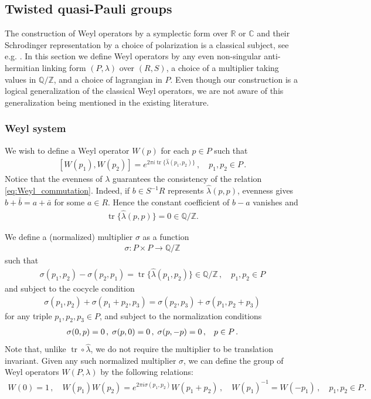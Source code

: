 \documentclass[sn-mathphys-num]{sn-jnl}
\theoremstyle{definition}
\numberwithin{equation}{section}
\theoremstyle{definition}
\def\IC{\mathbb{C}}
\def\IQ{\mathbb{Q}}
\def\IR{{\mathbb{R}}}
\def\IZ{{\mathbb{Z}}}
\def\l{{\lambda}}
\def\hl{{\hat \lambda}}
\def\tr{\operatorname{tr}}
\begin{document}
\subsection{Twisted quasi-Pauli groups}\label{sec:twisted_quasi_pauli}

The construction of Weyl operators  by a symplectic form over $\IR$ or $\IC$ and their Schrodinger representation by a choice of polarization is a classical subject, see e.g. \cite{Howe1980OnTR, Folland,denittis2025topologicaldescriptionpureinvariant}. 
In this section we define Weyl operators by any even non-singular anti-hermitian linking form $(P,\l)$ over $(R,S)$, a choice of a multiplier taking values in $\IQ/\IZ$, and a choice of lagrangian in $P$. Even though our construction is a logical generalization of the classical  Weyl operators, we are not aware of this generalization being mentioned in the existing literature.

  \subsubsection{Weyl system}
We wish to define a Weyl operator $W(p)$ for each $p\in P$ such that
\begin{align}\label{eq:Weyl_commutation}
    [W(p_1),W(p_2)]=e^{2\pi i \tr \{\hl(p_1,p_2)\}}\,,\quad p_1,p_2\in P\,.
\end{align}
Notice that the evenness of $\l$ guarantees the consistency of the relation \eqref{eq:Weyl_commutation}. Indeed, if $b\in S^{-1}R$ represents $\hl(p,p)$, evenness gives $b+\bar b=a+\bar a$ for some $a\in R$. Hence the constant coefficient of $b-a$ vanishes and 
\begin{align} 
\tr\{\hl(p,p)\}=0\in\IQ/\IZ.
\end{align} 

We define a (normalized) multiplier $\sigma$ as a function
   \begin{align}
       \sigma:P\times P\to \IQ/\IZ
   \end{align}
   such that 
   \begin{align}\label{bicharacter_relation}
       \sigma(p_1,p_2)-\sigma(p_2,p_1)=\tr\{\hl(p_1,p_2)\}\in \IQ/\IZ\,,\quad p_1,p_2\in P
   \end{align}
  and subject to the cocycle condition 
   \begin{align}
\sigma(p_1,p_2)+\sigma(p_1+p_2,p_3)=\sigma(p_2,p_3)+\sigma(p_1,p_2+p_3)
   \end{align}
for any triple $p_1,p_2,p_3\in P$, and subject to the normalization conditions
\begin{align}
    \sigma(0,p)=0\,,\;\sigma(p,0)=0\,,\;\sigma(p,-p)=0\,,\hspace{3mm} p\in P\,.
\end{align}
Note that, unlike $\tr\circ \hl$, we do not require the multiplier to be translation invariant. Given any such normalized multiplier $\sigma$, we can define the group of  Weyl operators $W(P,\lambda)$ by the following relations:
\begin{align}\label{eq:Weyl_relations}
    W(0)=1\,,\quad W(p_1)W(p_2)=e^{2\pi i \sigma(p_1,p_2)}W(p_1+p_2)\,,\quad W(p_1)^{-1}=W(-p_1)\,,\quad p_1,p_2\in P\,.
\end{align}
\end{document}
